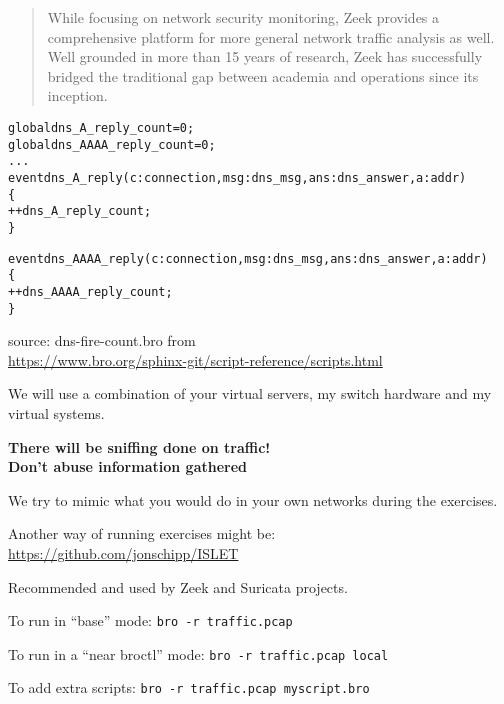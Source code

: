\documentclass[Screen16to9,17pt]{foils}
\begin{document}

\begin{quote}
While focusing on network security monitoring, Zeek provides a comprehensive platform for more general network traffic analysis as well. Well grounded in more than 15 years of research, Zeek has successfully bridged the traditional gap between academia and operations since its inception.
\end{quote}






\begin{alltt}\small
global dns_A_reply_count=0;
global dns_AAAA_reply_count=0;
...
event dns_A_reply(c: connection, msg: dns_msg, ans: dns_answer, a: addr)
        \{
        ++dns_A_reply_count;
        \}

event dns_AAAA_reply(c: connection, msg: dns_msg, ans: dns_answer, a: addr)
        \{
        ++dns_AAAA_reply_count;
        \}
\end{alltt}

source: dns-fire-count.bro from\\
{\small {}
\url{https://www.bro.org/sphinx-git/script-reference/scripts.html}}




We will use a combination of your virtual servers, my switch hardware and my virtual systems.

\vskip 1cm
{\Large \bf There will be sniffing done on traffic!\\
Don't abuse information gathered}

We try to mimic what you would do in your own networks during the exercises.

Another way of running exercises might be:\\
\url{https://github.com/jonschipp/ISLET}

Recommended and used by Zeek and Suricata projects.


\begin{list1}
\item To run in “base” mode:
 \verb+bro -r traffic.pcap+
\item To run in a “near broctl” mode:
\verb+bro -r traffic.pcap local+
\item To add extra scripts:
\verb+bro -r traffic.pcap myscript.bro+
\end{list1}
\end{document}
